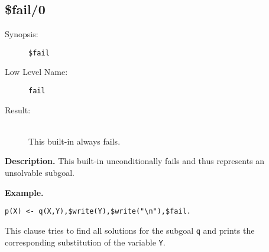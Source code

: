 %
%
%
\subsection{\$fail/0}

\begin{description}
\item[Synopsis:]
	{\tt \$fail}
\item[Low Level Name:]
	{\tt fail }
\item[Result:]\ \\
This built-in always fails.
\end{description}

\vspace*{0.5cm}
\noindent
{\bf Description.}
This built-in unconditionally fails and thus represents an
unsolvable subgoal.

\vspace*{0.5cm}
\noindent
{\bf Example.}
\begin{verbatim}
p(X) <- q(X,Y),$write(Y),$write("\n"),$fail.
\end{verbatim}

This clause tries to find all solutions for the subgoal {\tt q} and
prints the corresponding substitution of the variable {\tt Y}.


